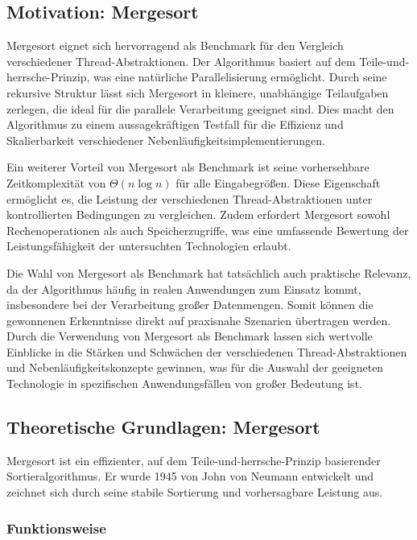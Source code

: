 \documentclass[fontsize=12pt,paper=a4,twoside=semi,parskip=half-,headsepline,headinclude]{scrreprt}
\begin{document}
\subsection{Motivation: Mergesort}
Mergesort eignet sich hervorragend als Benchmark für den Vergleich verschiedener Thread-Abstraktionen. Der Algorithmus basiert auf dem Teile-und-herrsche-Prinzip, was eine na\-tür\-li\-che Parallelisierung ermöglicht. Durch seine rekursive Struktur lässt sich Mergesort in kleinere, unabhängige Teilaufgaben zerlegen, die ideal für die parallele Verarbeitung geeignet sind. Dies macht den Algorithmus zu einem aussagekräftigen Testfall für die Effizienz und Skalierbarkeit verschiedener Nebenläufigkeitsimplementierungen.

Ein weiterer Vorteil von Mergesort als Benchmark ist seine vorhersehbare Zeitkomplexität von $\Theta(n\log{}n)$ für alle Eingabegrößen. Diese Eigenschaft ermöglicht es, die Leistung der verschiedenen Thread-Abstraktionen unter kontrollierten Bedingungen zu vergleichen. Zudem erfordert Mergesort sowohl Rechenoperationen als auch Speicherzugriffe, was eine umfassende Bewertung der Leistungsfähigkeit der untersuchten Technologien erlaubt.

Die Wahl von Mergesort als Benchmark hat tatsächlich auch praktische Relevanz, da der Algorithmus häufig in realen Anwendungen zum Einsatz kommt, insbesondere bei der Verarbeitung großer Datenmengen. Somit können die gewonnenen Erkenntnisse direkt auf praxisnahe Szenarien übertragen werden. Durch die Verwendung von Mergesort als Benchmark lassen sich wertvolle Einblicke in die Stärken und Schwächen der verschiedenen Thread-Abstraktionen und Nebenläufigkeitskonzepte gewinnen, was für die Auswahl der geeigneten Technologie in spezifischen Anwendungsfällen von großer Bedeutung ist.

\subsection{Theoretische Grundlagen: Mergesort}

Mergesort ist ein effizienter, auf dem Teile-und-herrsche-Prinzip basierender Sortieralgorithmus. Er wurde 1945 von John von Neumann entwickelt \cite{vonNeumann1945} und zeichnet sich durch seine stabile Sortierung und vorhersagbare Leistung aus.

\subsubsection{Funktionsweise}
\end{document}
